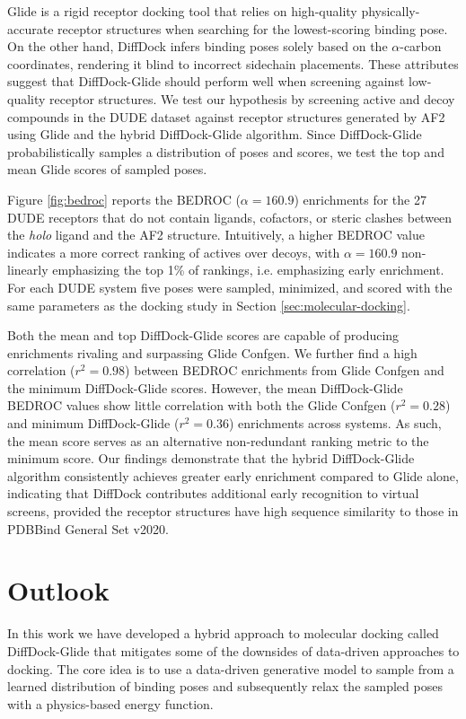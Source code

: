 \documentclass[%
 aip,
 amsmath,amssymb,
 reprint,%
]{revtex4-1}
\newcommand{\lh}[1]{{\color{blue}{#1}}}
\newcommand{\jd}[1]{{\color{red}{#1}}}
\begin{document}
Glide is a rigid receptor docking tool that relies on high-quality physically-accurate receptor structures when searching for the lowest-scoring binding pose. On the other hand, DiffDock infers binding poses solely based on the $\alpha$-carbon coordinates, rendering it blind to incorrect sidechain placements. These attributes suggest that DiffDock-Glide should perform well when screening against low-quality receptor structures. We test our hypothesis by screening active and decoy compounds in the DUDE dataset against receptor structures generated by AF2 using Glide and the hybrid DiffDock-Glide algorithm. Since DiffDock-Glide probabilistically samples a distribution of poses and scores, we test the top and mean Glide scores of sampled poses.

Figure \ref{fig:bedroc} reports the BEDROC\cite{truchon2007bedroc} ($\alpha=160.9$) enrichments for the 27 DUDE receptors that do not contain ligands, cofactors, or steric clashes between the {\it holo} ligand and the AF2 structure. Intuitively, a higher BEDROC value indicates a more correct ranking of actives over decoys, with $\alpha=160.9$ non-linearly emphasizing the top 1\% of rankings, i.e. emphasizing early enrichment. For each DUDE system five poses were sampled, minimized, and scored with the same parameters as the docking study in Section \ref{sec:molecular-docking}. 

\jd{@lukas let's add in the unconditional diffdock-glide results from Gary's run}
\lh{Ok. Will add a table w/ Gary's EF1\% values and my EF1\%.}

Both the mean and top DiffDock-Glide scores are capable of producing enrichments rivaling and surpassing Glide Confgen. We further find a high correlation ($r^2=0.98$) between BEDROC enrichments from Glide Confgen and the minimum DiffDock-Glide scores. However, the mean DiffDock-Glide BEDROC values show little correlation with both the Glide Confgen ($r^2=0.28$) and minimum DiffDock-Glide ($r^2=0.36$) enrichments across systems. As such, the mean score serves as an alternative non-redundant ranking metric to the minimum score. Our findings demonstrate that the hybrid DiffDock-Glide algorithm consistently achieves greater early enrichment compared to Glide alone, indicating that DiffDock contributes additional early recognition to virtual screens, provided the receptor structures have high sequence similarity to those in PDBBind General Set v2020.

\section{Outlook}
In this work we have developed a hybrid approach to molecular docking called DiffDock-Glide that mitigates some of the downsides of data-driven approaches to docking. The core idea is to use a data-driven generative model to sample from a learned distribution of binding poses and subsequently relax the sampled poses with a physics-based energy function. 
\end{document}
